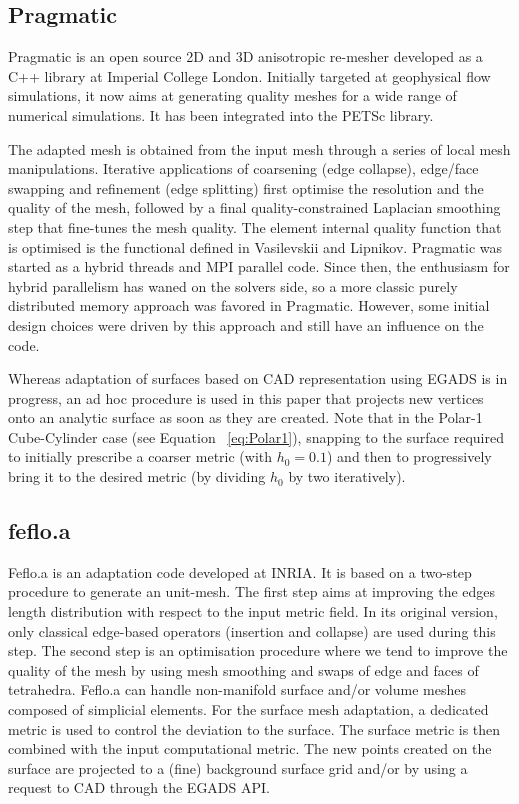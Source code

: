 \documentclass[3p,times,procedia,number]{elsarticle}
\begin{document}
\subsection{Pragmatic}

Pragmatic\cite{pragmatic-website,Gorman-2015} is an open source 2D and
3D anisotropic re-mesher developed as a C++ library at Imperial College
London.
Initially targeted at geophysical flow simulations, it now
aims at generating quality meshes for a wide range of numerical
simulations.
It has been integrated into the PETSc library.\cite{petsc-user-ref,Barral-2016}

The adapted mesh is obtained from the input mesh through a series of
local mesh manipulations. Iterative applications of coarsening (edge collapse),
edge/face swapping and refinement (edge splitting) first optimise the
resolution and the quality of the mesh, followed by a final
quality-constrained Laplacian smoothing step that fine-tunes the mesh
quality. The element internal quality function that is optimised is
the functional defined in Vasilevskii and Lipnikov.\cite{Vasilevskii-1999}
Pragmatic was started as a hybrid threads and MPI parallel code. Since
then, the enthusiasm for hybrid parallelism has waned on the solvers side,
so a more classic purely distributed memory approach was favored in 
Pragmatic. However, some initial design 
choices were driven by this approach and still have an influence on the code. 

Whereas adaptation of surfaces based on CAD representation using EGADS
is in progress, an ad hoc procedure is used in this paper that projects 
new vertices onto an analytic surface as soon as they are created.
Note that in the Polar-1 Cube-Cylinder case (see Equation ~\ref{eq:Polar1}), snapping 
to the surface required to initially prescribe a coarser metric (with $h_0 = 0.1$)
and then to progressively bring it to the desired metric (by dividing 
$h_0$ by two iteratively).


\subsection{feflo.a}

Feflo.a is an adaptation code developed at INRIA.
It is based on a two-step procedure to generate an unit-mesh.\cite{loseille-lohner-adapt-boom, loseille-handbook}
The first step aims at improving the edges length distribution
with respect to the input metric field.
In its original version, only classical edge-based operators (insertion and collapse) are used during this step.
The second step is an optimisation procedure where we tend to improve the quality of the mesh by using mesh smoothing
and swaps of edge and faces of tetrahedra.
Feflo.a can handle non-manifold surface and/or volume meshes composed of simplicial elements.
For the surface mesh
adaptation, a dedicated metric is used to control the deviation to the surface.
The surface metric is then combined with the input computational metric.
The new points created on the surface are projected to a (fine) background surface grid and/or by using a request to CAD through the EGADS API.
\end{document}
